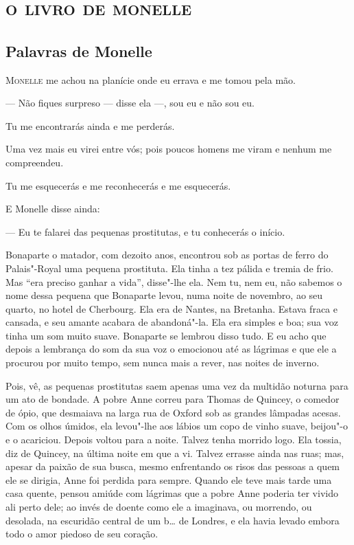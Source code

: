 \part{\textsc{o livro de monelle}}

\chapter{Palavras de Monelle}  

\textsc{Monelle} me achou na planície onde eu errava e me tomou pela mão.

--- Não fiques surpreso --- disse ela ---, sou eu e não sou eu.

Tu me encontrarás ainda e me perderás.

Uma vez mais eu virei entre vós; pois poucos homens me viram e nenhum
me compreendeu.

Tu me esquecerás e me reconhecerás e me esquecerás.

E Monelle disse ainda: 

--- Eu te falarei das pequenas prostitutas, e tu conhecerás o início.

Bonaparte o matador, com dezoito anos, encontrou sob as portas de ferro
do Palais"-Royal uma pequena prostituta. Ela tinha a tez pálida e tremia de
frio. Mas “era preciso ganhar a vida”, disse"-lhe ela. Nem tu, nem eu, não
sabemos o nome dessa pequena que Bonaparte levou, numa noite de novembro,
ao seu quarto, no hotel de Cherbourg. Ela era de Nantes, na Bretanha.
Estava fraca e cansada, e seu amante acabara de abandoná"-la. Ela era
simples e boa; sua voz tinha um som muito suave. Bonaparte se lembrou disso
tudo. E eu acho que depois a lembrança do som da sua voz o emocionou até
as lágrimas e que ele a procurou por muito tempo, sem nunca mais a rever,
nas noites de inverno.

Pois, vê, as pequenas prostitutas saem apenas uma vez da multidão
noturna para um ato de bondade. A pobre Anne correu para Thomas de
Quincey, o comedor de ópio, que desmaiava na larga rua de Oxford sob as
grandes lâmpadas acesas. Com os olhos úmidos, ela levou"-lhe aos lábios um
copo de vinho suave, beijou"-o e o acariciou. Depois voltou para a noite.
Talvez tenha morrido logo. Ela tossia, diz de Quincey, na última noite em
que a vi. Talvez errasse ainda nas ruas; mas, apesar da paixão de sua
busca, mesmo enfrentando os risos das pessoas a quem ele se dirigia, Anne
foi perdida para sempre. Quando ele teve mais tarde uma casa quente, pensou
amiúde com lágrimas que a pobre Anne poderia ter vivido ali perto
dele; ao invés de doente como ele a imaginava, ou morrendo, ou desolada,
na escuridão central de um b\ldots{} de Londres, e ela havia levado 
embora todo o amor piedoso de seu coração.

